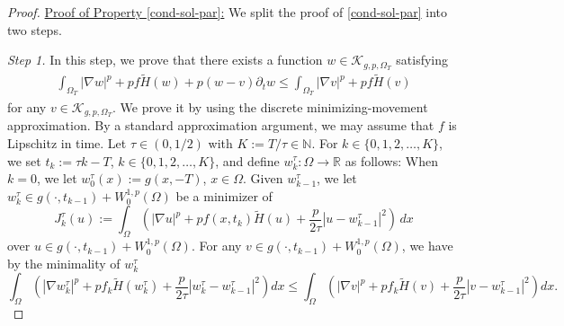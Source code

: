 \documentclass[11pt,oneside,english]{amsart}
\newcommand{\R}{{\mathbb R}}
\newcommand{\N}{{\mathbb N}}
\newcommand{\cK}{{\mathcal K}}
\newcommand{\D}{\nabla}
\numberwithin{equation}{section}
\theoremstyle{plain}
\numberwithin{equation}{section}
\begin{document}
\begin{proof}
\underline{Proof of Property \ref{cond-sol-par}:} We split the proof of \ref{cond-sol-par} into two steps.

\medskip\noindent\emph{Step 1.} In this step, we prove that there exists a function $w\in \cK_{g,p,\Omega_T}$ satisfying
\begin{align}\label{eq:par-var-ineq-1}
\int_{\Omega_T}|\D w|^p+pf\tilde H(w)+p(w-v)\partial_tw\le \int_{\Omega_T}|\D v|^p+pf\tilde H(v)
\end{align}
for any $v\in \cK_{g,p,\Omega_T}$. We prove it by using the discrete minimizing-movement approximation. 
By a standard approximation argument, we may assume that $f$ is Lipschitz in time. Let $\tau\in(0,1/2)$ with $K:=T/\tau\in \N$. For $k\in \{0,1,2,\ldots,K\}$, we set $t_k:=\tau k-T$, $k\in \{0,1,2,\ldots, K\}$, and define $w_k^\tau:\Omega\to\R$ as follows: When $k=0$, we let $w_0^\tau(x):=g(x,-T)$, $x\in \Omega$. Given $w_{k-1}^\tau$, we let $w_k^\tau\in g(\cdot,t_{k-1})+W^{1,p}_0(\Omega)$ be a minimizer of
$$
J_k^\tau(u):=\int_{\Omega}\left(|\D u|^p+pf(x,t_k)\tilde H(u)+\frac{p}{2\tau}|u-w_{k-1}^\tau|^2 \right)\,dx
$$
over $u\in g(\cdot,t_{k-1})+W^{1,p}_0(\Omega)$. For any $v\in g(\cdot,t_{k-1})+W^{1,p}_0(\Omega)$, we have by the minimality of $w_k^\tau$
\begin{equation*}
    \int_\Omega\left(|\D w_{k}^\tau|^p
    +pf_k\tilde H(w_k^\tau)
    +\frac{p}{2\tau}|w_k^\tau-w_{k-1}^\tau|^2 \right)dx
    \le \int_\Omega\left(|\D v|^p
    +pf_k\tilde H(v)
    +\frac{p}{2\tau}|v-w_{k-1}^\tau|^2 \right)dx. 
\end{equation*}


\end{proof}
\end{document}
